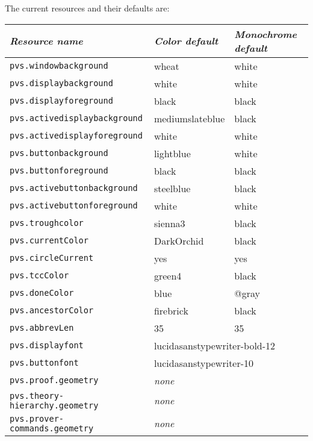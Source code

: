 The current resources and their defaults are:

\begin{center}
\begin{tabular}{|lll|}\hline
  {\it Resource name} & {\it Color default} & {\it Monochrome default}%
     \\ \hline
  \texttt{pvs.windowbackground} & wheat & white \\
  \texttt{pvs.displaybackground} & white & white \\
  \texttt{pvs.displayforeground} & black & black \\
  \texttt{pvs.activedisplaybackground} & mediumslateblue & black \\
  \texttt{pvs.activedisplayforeground} & white & white \\
  \texttt{pvs.buttonbackground} & lightblue & white \\
  \texttt{pvs.buttonforeground} & black & black \\
  \texttt{pvs.activebuttonbackground} & steelblue & black \\
  \texttt{pvs.activebuttonforeground} & white & white \\
  \texttt{pvs.troughcolor} & sienna3 & black \\
  \texttt{pvs.currentColor} & DarkOrchid & black \\
  \texttt{pvs.circleCurrent} & yes & yes \\
  \texttt{pvs.tccColor} & green4 & black \\
  \texttt{pvs.doneColor} & blue & @gray \\
  \texttt{pvs.ancestorColor} & firebrick & black \\
  \texttt{pvs.abbrevLen} & 35 & 35 \\
  \texttt{pvs.displayfont} & \multicolumn{2}{l|}{lucidasanstypewriter-bold-12} \\
  \texttt{pvs.buttonfont} & \multicolumn{2}{l|}{lucidasanstypewriter-10} \\
  \texttt{pvs.proof.geometry} & \multicolumn{2}{l|}{\hspace*{.5in}\emph{none}} \\
  \texttt{pvs.theory-hierarchy.geometry} & \multicolumn{2}{l|}{\hspace*{.5in}\emph{none}} \\
  \texttt{pvs.prover-commands.geometry} & \multicolumn{2}{l|}{\hspace*{.5in}\emph{none}} \\
  \hline
\end{tabular}
\end{center}


